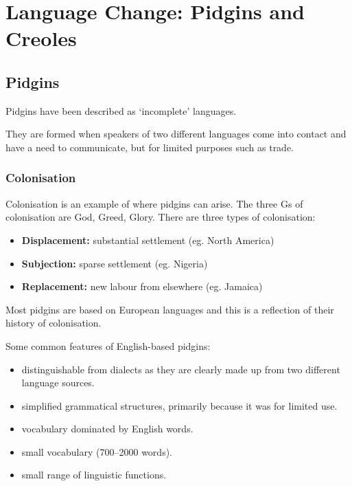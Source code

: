 \documentclass[../main.tex]{subfiles}
\begin{document}
    \chapter{Language Change: Pidgins and Creoles}

    \section{Pidgins}
    Pidgins have been described as `incomplete' languages. \par
    They are formed when speakers of two different languages come into contact and have a need to communicate, but for limited purposes such as trade. \par

    \subsection{Colonisation}
    Colonisation is an example of where pidgins can arise. The three Gs of colonisation are God, Greed, Glory. There are three types of colonisation: 
    \begin{itemize}
        \item \textbf{Displacement:} substantial settlement (eg. North America)
        \item \textbf{Subjection:} sparse settlement (eg. Nigeria)
        \item \textbf{Replacement:} new labour from elsewhere (eg. Jamaica)
    \end{itemize}
    Most pidgins are based on European languages and this is a reflection of their history of colonisation.


    Some common features of English-based pidgins:
    \begin{itemize}
        \item distinguishable from dialects as they are clearly made up from two different language sources.
        \item simplified grammatical structures, primarily because it was for limited use.
        \item vocabulary dominated by English words.
        \item small vocabulary (700--2000 words).
        \item small range of linguistic functions.
    \end{itemize}
\end{document}
